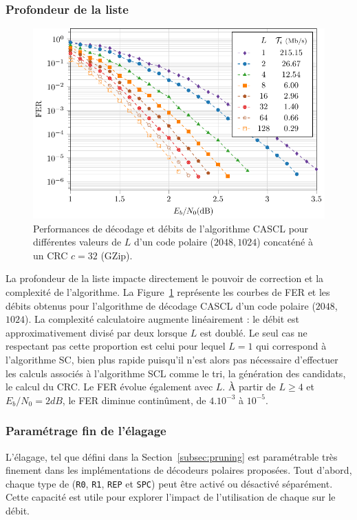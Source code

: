 \subsubsection{Profondeur de la liste}
\begin{figure}[t]
\includegraphics[width=\textwidth]{main/ch2_fig/curves/L/tikz/L}
\caption{Performances de décodage et débits de l'algorithme CASCL pour différentes valeurs de $L$ d'un code polaire ($2048,1024$) concaténé à un CRC $c=32$ (GZip).}
\label{fig:scl_l_thr}
\end{figure}
La profondeur de la liste impacte directement le pouvoir de correction et la complexité de l'algorithme. La Figure~\ref{fig:scl_l_thr} représente les courbes de FER et les débits obtenus pour l'algorithme de décodage CASCL d'un code polaire ($2048$,$1024$). La complexité calculatoire augmente linéairement : le débit est approximativement divisé par deux lorsque $L$ est doublé. Le seul cas ne respectant pas cette proportion est celui pour lequel $L=1$ qui correspond à l'algorithme SC, bien plus rapide puisqu'il n'est alors pas nécessaire d'effectuer les calculs associés à l'algorithme SCL comme le tri, la génération des candidats, le calcul du CRC. Le FER évolue également avec $L$. \`A partir de $L\geq4$ et $E_b/N_0=2dB$, le FER diminue continûment, de $4.10^{-3}$ à $10^{-5}$.

\subsubsection{Paramétrage fin de l'élagage}
L'élagage, tel que défini dans la Section~\ref{subsec:pruning} est paramétrable très finement dans les implémentations de décodeurs polaires proposées. Tout d'abord, chaque type de \noeud (\texttt{R0}, \texttt{R1}, \texttt{REP} et \texttt{SPC}) peut être activé ou désactivé séparément. Cette capacité est utile pour explorer l'impact de l'utilisation de chaque \noeud sur le débit.

